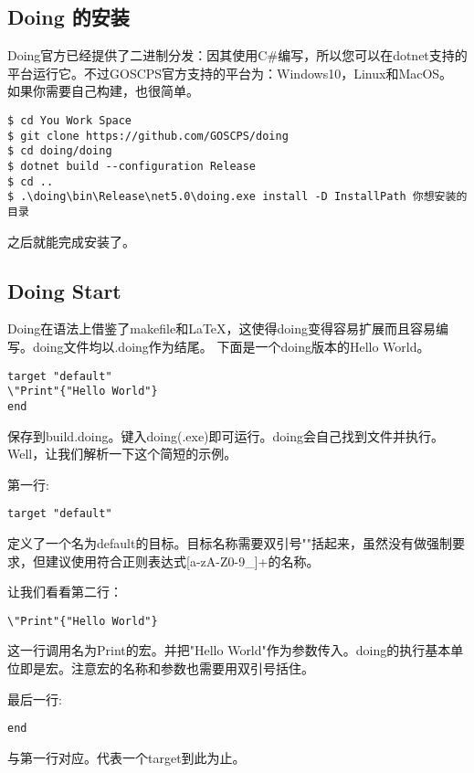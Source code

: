 \subsection{Doing 的安装}
Doing官方已经提供了二进制分发：因其使用C\#编写，所以您可以在dotnet支持的平台运行它。不过GOSCPS官方支持的平台为：Windows10，Linux和MacOS。
\newline{}
如果你需要自己构建，也很简单。
\begin{lstlisting}
$ cd You Work Space
$ git clone https://github.com/GOSCPS/doing
$ cd doing/doing
$ dotnet build --configuration Release
$ cd ..
$ .\doing\bin\Release\net5.0\doing.exe install -D InstallPath 你想安装的目录
\end{lstlisting}
之后就能完成安装了。

\subsection{Doing Start}
Doing在语法上借鉴了makefile和\LaTeX{}，这使得doing变得容易扩展而且容易编写。doing文件均以.doing作为结尾。
下面是一个doing版本的Hello World。
\newline{}
\begin{lstlisting}
target "default"
\"Print"{"Hello World"}
end
\end{lstlisting}
保存到build.doing。键入doing(.exe)即可运行。doing会自己找到文件并执行。Well，让我们解析一下这个简短的示例。
\newline{}

第一行:
\begin{lstlisting}
target "default"
\end{lstlisting}
定义了一个名为default的目标。目标名称需要双引号""括起来，虽然没有做强制要求，但建议使用符合正则表达式[a-zA-Z0-9\_]+的名称。
\newline{}

让我们看看第二行：
\begin{lstlisting}
\"Print"{"Hello World"}
\end{lstlisting}
这一行调用名为Print的宏。并把"Hello World"作为参数传入。doing的执行基本单位即是宏。注意宏的名称和参数也需要用双引号括住。

最后一行:
\begin{lstlisting}
end
\end{lstlisting}
与第一行对应。代表一个target到此为止。
\newline{}
\newline{}

